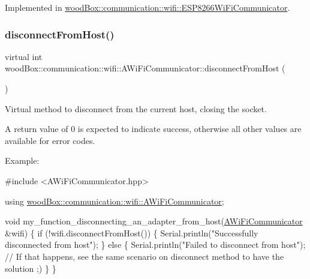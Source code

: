 Implemented in \mbox{\hyperlink{classwood_box_1_1communication_1_1wifi_1_1_e_s_p8266_wi_fi_communicator_af30a81a7f279c11241b3df0878289af0}{wood\+Box\+::communication\+::wifi\+::\+E\+S\+P8266\+Wi\+Fi\+Communicator}}.

\mbox{\label{classwood_box_1_1communication_1_1wifi_1_1_a_wi_fi_communicator_aeb87d8a22ad08c929c28191a4c725a5b}} 
\subsubsection{\texorpdfstring{disconnect\+From\+Host()}{disconnectFromHost()}}
{\footnotesize\ttfamily virtual int wood\+Box\+::communication\+::wifi\+::\+A\+Wi\+Fi\+Communicator\+::disconnect\+From\+Host (\begin{DoxyParamCaption}{ }\end{DoxyParamCaption})\hspace{0.3cm}{\ttfamily [pure virtual]}}

Virtual method to disconnect from the current host, closing the socket.

A return value of 0 is expected to indicate success, otherwise all other values are available for error codes.

Example\+:


\begin{DoxyCode}
\textcolor{preprocessor}{#include <AWiFiCommunicator.hpp>}

\textcolor{keyword}{using} \mbox{\hyperlink{classwood_box_1_1communication_1_1wifi_1_1_a_wi_fi_communicator}{woodBox::communication::wifi::AWiFiCommunicator}};

\textcolor{keywordtype}{void} my\_function\_disconnecting\_an\_adapter\_from\_host(\mbox{\hyperlink{classwood_box_1_1communication_1_1wifi_1_1_a_wi_fi_communicator_a9d1dc13ca9243170b04211bef2b86ed2}{AWiFiCommunicator}} &wifi) \{
  \textcolor{keywordflow}{if} (!wifi.disconnectFromHost()) \{
    Serial.println(\textcolor{stringliteral}{"Successfully disconnected from host"});
  \} \textcolor{keywordflow}{else} \{
    Serial.println(\textcolor{stringliteral}{"Failed to disconnect from host"}); \textcolor{comment}{// If that happens, see the same scenario on
       disconnect method to have the solution ;)}
  \}
\}
\end{DoxyCode}
 

